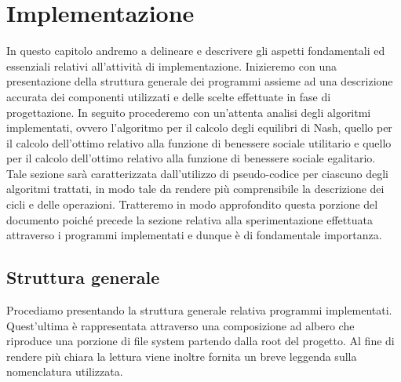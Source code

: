\chapter{Implementazione}
\justify
In questo capitolo andremo a delineare e descrivere gli aspetti fondamentali ed essenziali relativi all'attività di implementazione. Inizieremo con una presentazione della struttura generale dei programmi assieme ad una descrizione accurata dei componenti utilizzati e delle scelte effettuate in fase di progettazione. In seguito procederemo con un'attenta analisi degli algoritmi implementati, ovvero l'algoritmo per il calcolo degli equilibri di Nash, quello per il calcolo dell'ottimo relativo alla funzione di benessere sociale utilitario e quello per il calcolo dell'ottimo relativo alla funzione di benessere sociale egalitario.\\
Tale sezione sarà caratterizzata dall'utilizzo di pseudo-codice per ciascuno degli algoritmi trattati, in modo tale da rendere più comprensibile la descrizione dei cicli e delle operazioni. Tratteremo in modo approfondito questa porzione del documento poiché precede la sezione relativa alla sperimentazione effettuata attraverso i programmi implementati e dunque è di fondamentale importanza.\\

\section{Struttura generale}
\justify
Procediamo presentando la struttura generale relativa programmi implementati. Quest'ultima è rappresentata attraverso una composizione ad albero che riproduce una porzione di file system partendo dalla root del progetto. Al fine di rendere più chiara la lettura viene inoltre fornita un breve leggenda sulla nomenclatura utilizzata.

